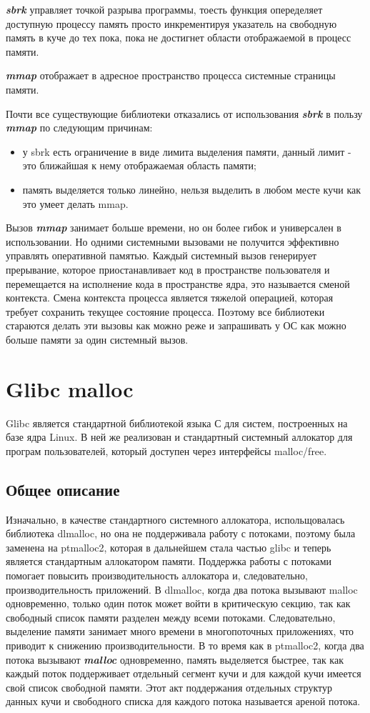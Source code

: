 \textbf{\textit{sbrk}} управляет точкой разрыва программы, тоесть функция   опеределяет доступную процессу память просто инкрементируя указатель на свободную память в куче до тех пока, пока не достигнет области отображаемой в процесс памяти.

\textbf{\textit{mmap}} отображает в адресное пространство процесса системные страницы памяти.

Почти все существующие библиотеки отказались от использования \textbf{\textit{sbrk}} в пользу \textbf{\textit{mmap}} по следующим причинам:
\begin{itemize}
	\item у sbrk есть ограничение в виде лимита выделения памяти, данный лимит - это ближайшая к нему отображаемая область памяти;
	\item память выделяется только линейно, нельзя выделить в любом месте кучи как это умеет делать mmap.
\end{itemize}

Вызов \textbf{\textit{mmap}} занимает больше времени, но он более гибок и универсален в использовании. Но одними системными вызовами не получится эффективно управлять оперативной памятью. Каждый системный вызов генерирует прерывание, которое приостанавливает код в пространстве пользователя и перемещается   на исполнение кода в пространстве  ядра, это называется сменой контекста. Смена контекста процесса является тяжелой операцией, которая требует сохранить текущее состояние процесса. Поэтому все библиотеки стараются делать эти вызовы как можно реже и запрашивать у ОС как можно больше памяти за один системный вызов.

\section{Glibc malloc}
Glibc является стандартной библиотекой языка С для систем, построенных на базе ядра Linux. В ней же реализован и стандартный системный аллокатор для програм пользователей, который доступен через интерфейсы malloc/free.

\subsection{Общее описание}
Изначально, в качестве стандартного системного аллокатора, испольщовалась библиотека dlmalloc, но она не поддерживала работу с потоками, поэтому была заменена на ptmalloc2, которая в дальнейшем стала частью glibc и теперь является стандартным аллокатором памяти. Поддержка работы с потоками помогает повысить производительность аллокатора и, следовательно, производительность приложений. В dlmalloc, когда два потока вызывают malloc одновременно, только один поток может войти в критическую секцию, так как свободный список памяти разделен между всеми потоками. Следовательно, выделение памяти занимает много времени в многопоточных приложениях, что приводит к снижению производительности. В то время как в ptmalloc2, когда два потока вызывают \textbf{\textit{malloc}} одновременно, память выделяется быстрее, так как каждый поток поддерживает отдельный сегмент кучи и для каждой кучи имеется свой список свободной памяти. Этот акт поддержания отдельных структур данных кучи и свободного списка для каждого потока называется ареной потока.

